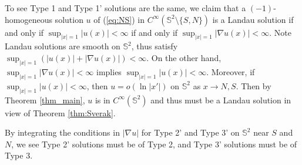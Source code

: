 \documentclass[12pt]{article}
\begin{document}
To see Type 1 and Type 1' solutions are the same, we claim that a $(-1)$-homogeneous solution $u$ of (\ref{eq:NS}) in $C^{\infty}(\mathbb{S}^2\setminus\{S, N\})$ is a Landau solution if and only if $\sup_{|x|=1}|u(x)|<\infty$ if and only if $\sup_{|x|=1}|\nabla u(x)|<\infty$. Note Landau solutions are smooth on $\mathbb{S}^2$, thus satisfy $\sup_{|x|=1}(|u(x)|+|\nabla u(x)|)<\infty$. On the other hand, $\sup_{|x|=1}|\nabla u(x)|<\infty$ implies $\sup_{|x|=1}|u(x)|<\infty$. Moreover, if $\sup_{|x|=1}|u(x)|<\infty$, then $u=o(\ln |x'|)$ on $\mathbb{S}^2$ as $x\to N, S$. Then by Theorem \ref{thm_main}, $u$ is in $C^{\infty}(\mathbb{S}^2)$ and thus must be a Landau solution in view of Theorem \ref{thm:Sverak}.

By integrating the conditions in $|\nabla u|$ for Type 2' and Type 3' on $\mathbb{S}^2$ near $S$ and $N$, we see Type 2' solutions must be of Type 2, and Type 3' solutions must be of Type 3.
\end{document}
